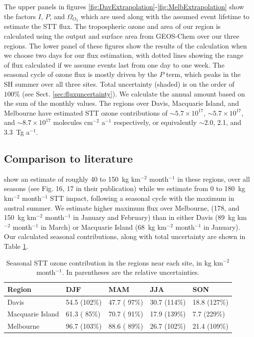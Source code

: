 \documentclass[acp, manuscript]{copernicus} %
\begin{document}
    The upper panels in figures \ref{fig:DavExtrapolation}-\ref{fig:MelbExtrapolation} show the factors $I$, $P$, and $\Omega_{O_3}$ which are used along with the assumed event lifetime to estimate the STT flux.
    The tropospheric ozone and area of our region is calculated using the output and surface area from GEOS-Chem over our three regions.
    The lower panel of these figures show the results of the calculation when we choose two days for our flux estimation, with dotted lines showing the range of flux calculated if we assume events last from one day to one week.
    The seasonal cycle of ozone flux is mostly driven by the $P$ term, which peaks in the SH summer over all three sites.
    Total uncertainty (shaded) is on the order of $100\%$ (see Sect. \ref{sec:fluxuncertainty}). 
    We calculate the annual amount based on the sum of the monthly values.
    The regions over Davis, Macquarie Island, and Melbourne have estimated STT ozone contributions of $\sim 5.7 \times 10^{17}$, $\sim 5.7 \times 10^{17}$, and $\sim 8.7 \times 10^{17}$ molecules cm$^{-2}$ a$^{-1}$ respectively, or equivalently $\sim 2.0$, 2.1, and 3.3~Tg a$^{-1}$.

  \subsection{Comparison to literature}
    \cite{Skerlak2014} show an estimate of roughly 40 to 150~kg km$^{-2}$ month$^{-1}$ in these regions, over all seasons (see Fig. 16, 17 in their publication) while we estimate from 0 to 180~kg km$^{-2}$ month$^{-1}$ STT impact, following a seasonal cycle with the maximum in austral summer.
    We estimate higher maximum flux over Melbourne, (178, and 150~kg km$^{-2}$ month$^{-1}$ in January and February) than in either Davis (89~kg km$^{-2}$ month$^{-1}$ in March) or Macquarie Island (68~kg km$^{-2}$ month$^{-1}$ in January).
    Our calculated seasonal contributions, along with total uncertainty are shown in Table \ref{table:extrapolationResults}.

    \begin{table}[t]
      \captionsetup{justification=centering}
      \caption{Seasonal STT ozone contribution in the regions near each site, in kg km$^{-2}$ month$^{-1}$. In parentheses are the relative uncertainties.}
      \begin{tabular}{ l l l l l } 
	\hline
	Region & DJF & MAM & JJA & SON \\
	\hline
	Davis        &  54.5 (102\%) & 47.7 ( 97\%) & 30.7 (114\%) & 18.8 (127\%)\\ 
	Macquarie Island   & 61.3 ( 85\%) & 70.7 ( 91\%) & 17.9 (139\%) &  7.7 (229\%) \\
	Melbourne   & 96.7 (103\%) & 88.6 ( 89\%) & 26.7 (102\%) & 21.4 (109\%) \\
	\hline
      \end{tabular}
      \label{table:extrapolationResults}
    \end{table}
\end{document}
